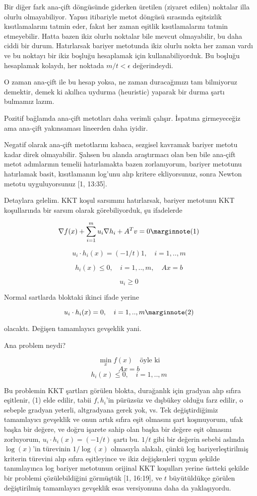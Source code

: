 \documentclass[12pt,fleqn]{article}\usepackage{../../common}
\begin{document}
Bir diğer fark ana-çift döngüsünde giderken üretilen (ziyaret edilen)
noktalar illa olurlu olmayabiliyor. Yapısı itibariyle metot döngüsü
sırasında eşitsizlik kısıtlamalarını tatmin eder, fakat her zaman eşitlik
kısıtlamalarını tatmin etmeyebilir. Hatta bazen ikiz olurlu noktalar bile
mevcut olmayabilir, bu daha ciddi bir durum. Hatırlarsak bariyer metotunda
ikiz olurlu nokta her zaman vardı ve bu noktayı bir ikiz boşluğu hesaplamak
için kullanabiliyorduk. Bu boşluğu hesaplamak kolaydı, her noktada
$m / t < \epsilon$ değerindeydi.

O zaman ana-çift ile bu hesap yoksa, ne zaman duracağımızı tam bilmiyoruz
demektir, demek ki akıllıca uydurma (heuristic) yaparak bir durma şartı
bulmamız lazım.

Pozitif bağlamda ana-çift metotları daha verimli çalışır. İspatına
girmeyeceğiz ama ana-çift yakınsaması lineerden daha iyidir.

Negatif olarak ana-çift metotlarını kabaca, sezgisel kavramak bariyer
metotu kadar direk olmayabilir. Şahsen bu alanda araştırmacı olan ben bile
ana-çift metot adımlarının temelii hatırlamakta bazen zorlanıyorum, bariyer
metotunu hatırlamak basit, kısıtlamanın log'unu alıp kritere ekliyorsunuz,
sonra Newton metotu uyguluyorsunuz [1, 13:35].

Detaylara gelelim. KKT koşul sarsımını hatırlarsak, bariyer metotunu KKT
koşullarında bir sarsım olarak görebiliyorduk, şu ifadelerde

$$
\nabla f(x) + \sum_{i=1}^{m} u_i\nabla h_i + A^T v = 0
\mlabel{1}
$$

$$
u_i \cdot h_i(x) = (-1/t) 1, \quad i=1,..,m
$$

$$
h_i(x) \le 0, \quad i=1,..,m, \quad Ax = b
$$

$$
u_i \ge 0
$$

Normal sartlarda bloktaki ikinci ifade yerine 

$$
u_i \cdot h_i(x) = 0, \quad i=1,..,m
\mlabel{2}
$$

olacaktı. Değişen tamamlayıcı gevşeklik yani.

Ana problem neydi?

$$
\min_x f(x) \quad \textrm{öyle ki}
$$
$$
Ax = b
$$
$$
h_i(x) \le 0, \quad i=1,..,m
$$

Bu problemin KKT şartları görülen blokta, durağanlık için gradyan alıp
sıfıra eşitlenir, (1) elde edilir, tabii $f,h_i$'in pürüzsüz ve dışbükey
olduğu farz edilir, o sebeple gradyan yeterli, altgradyana gerek yok, vs.
Tek değiştirdiğimiz tamamlayıcı gevşeklik ve onun artık sıfıra eşit
olmasını şart koşmuyorum, ufak başka bir değere, ve doğru işarete sahip
olan başka bir değere eşit olmasını zorluyorum, $u_i \cdot h_i(x) = (-1/t)$
şartı bu. $1/t$ gibi bir değerin sebebi aslında $\log(x)$'in türevinin
$1/\log(x)$ olmasıyla alakalı, çünkü log bariyerleştirilmiş kriterin
türevini alıp sıfıra eşitleyince ve ikiz değişkenleri uygun şekilde
tanımlayınca log bariyer metotunun orijinal KKT koşulları yerine üstteki
şekilde bir problemi çözülebildiğini görmüştük [1, 16:19], ve $t$
büyütüldükçe görülen değiştirilmiş tamamlayıcı gevşeklik esas versiyonuna
daha da yaklaşıyordu.
\end{document}
